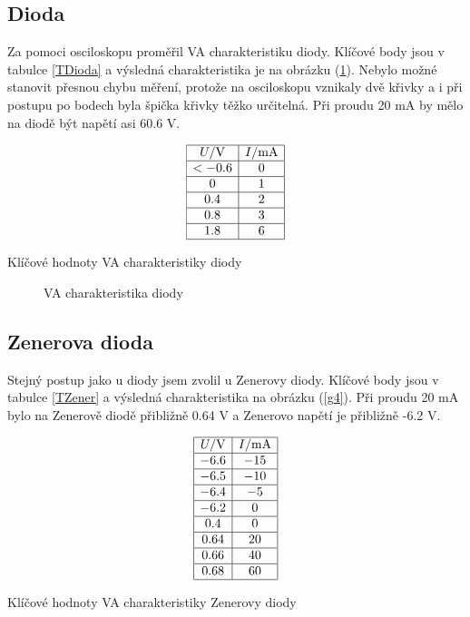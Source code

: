 \documentclass[a4paper,12pt]{article}
\begin{document}
\subsection{Dioda}
Za pomoci osciloskopu proměřil VA charakteristiku diody. Klíčové body jsou v tabulce 
\ref{TDioda} a výsledná charakteristika je na obrázku (\ref{g3}). Nebylo možné stanovit přesnou 
chybu měření, protože na osciloskopu vznikaly dvě křivky a i při postupu po bodech byla špička 
křivky těžko určitelná. Při proudu 20 mA by mělo na diodě být napětí asi 60.6 V.

\begin{table}
$$
\begin{array}{|c|c|}
\hline
U/\mbox{V}& I/\mbox{mA} \\ \hline
<-0.6&  0 \\ \hline
0&  1 \\ \hline
0.4&    2 \\ \hline
0.8&    3 \\ \hline
1.8&    6 \\ \hline
\end{array}
$$
\caption{Klíčové hodnoty VA charakteristiky diody}
\label{TDioda}
\end{table}

\begin{figure}
\begin{center}

\end{center}
\caption{VA charakteristika diody}
\label{g3}
\end{figure}

\subsection{Zenerova dioda}
Stejný postup jako u diody jsem zvolil u Zenerovy diody. Klíčové body jsou v tabulce \ref{TZener} 
a výsledná charakteristika na obrázku (\ref{g4}). Při proudu 20 mA bylo na Zenerově diodě přibližně 0.64 V a Zenerovo napětí je přibližně -6.2 V.

\begin{table}
$$
\begin{array}{|c|c|}
\hline
U/\mbox{V}& I/\mbox{mA} \\ \hline
-6.6&  -15 \\ \hline
-6.5&  -10 \\ \hline
-6.4&    -5 \\ \hline
-6.2&    0 \\ \hline
0.4&    0 \\ \hline
0.64&    20 \\ \hline
0.66&    40 \\ \hline
0.68&    60 \\ \hline
\end{array}
$$
\caption{Klíčové hodnoty VA charakteristiky Zenerovy diody}
\label{TZener}
\end{table}
\end{document}
